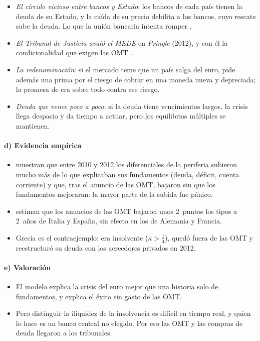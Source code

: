\documentclass[11pt]{article}
\begin{document}
\begin{itemize}
\item \emph{El círculo vicioso entre bancos y Estado}: los bancos de cada país tienen la deuda de su Estado, y la caída de su precio debilita a los bancos, cuyo rescate sube la deuda. Lo que la unión bancaria intenta romper  .
\item \emph{El Tribunal de Justicia avaló el MEDE} en \emph{Pringle} (2012)\nocite{TJUE2012Pringle}, y con él la condicionalidad que exigen las OMT .
\item \emph{La redenominación}: si el mercado teme que un país salga del euro, pide además una prima por el riesgo de cobrar en una moneda nueva y depreciada; la promesa de  era sobre todo contra ese riesgo.
\item \emph{Deuda que vence poco a poco}: si la deuda tiene vencimientos largos, la crisis llega despacio y da tiempo a actuar, pero los equilibrios múltiples se mantienen\nocite{LorenzoniWerning2019Slow}.
\end{itemize}

\paragraph{d) Evidencia empírica}

\begin{itemize}
\item \textcite{DeGrauweJi2013Self} muestran que entre 2010 y 2012 los diferenciales de la periferia subieron mucho más de lo que explicaban sus fundamentos (deuda, déficit, cuenta corriente) y que, tras el anuncio de las OMT, bajaron sin que los fundamentos mejoraran: la mayor parte de la subida fue pánico.
\item \textcite{AltavillaGiannoneLenza2016} estiman que los anuncios de las OMT bajaron unos 2~puntos los tipos a 2~años de Italia y España, sin efecto en los de Alemania y Francia.
\item Grecia es el contraejemplo: era insolvente ($\kappa>\tfrac14$), quedó fuera de las OMT y reestructuró su deuda con los acreedores privados en 2012\nocite{DeGrauwe2022Economics}.
\end{itemize}

\paragraph{e) Valoración}

\begin{itemize}
\item El modelo explica la crisis del euro mejor que una historia solo de fundamentos, y explica el éxito sin gasto de las OMT.
\item Pero distinguir la iliquidez de la insolvencia es difícil en tiempo real, y quien lo hace es un banco central no elegido. Por eso las OMT y las compras de deuda llegaron a los tribunales.
\end{itemize}
\end{document}
